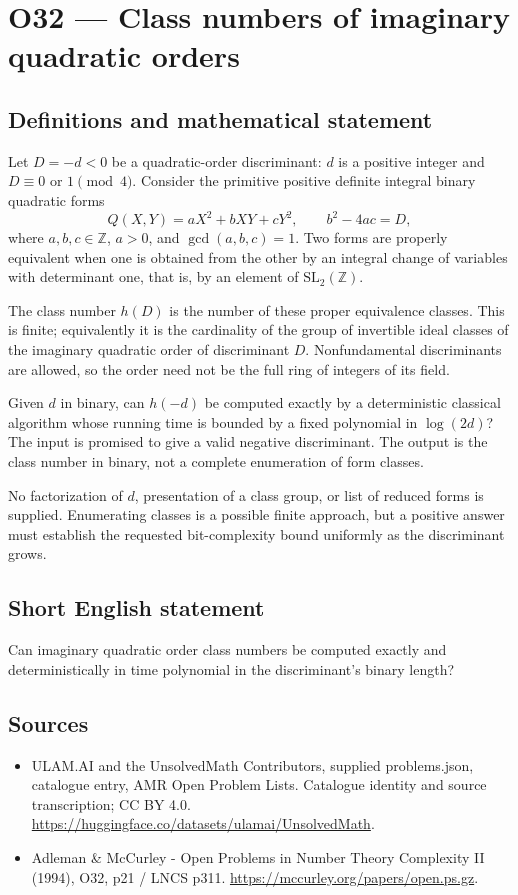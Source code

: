 \documentclass[11pt,a4paper]{article}
\begin{document}
\section*{O32 — Class numbers of imaginary quadratic orders}\label{statement}

\subsection{Definitions and mathematical statement}
Let $D=-d<0$ be a quadratic-order discriminant: $d$ is a positive integer and $D\equiv0$ or $1\pmod4$. Consider the primitive positive definite integral binary quadratic forms
\[
Q(X,Y)=aX^2+bXY+cY^2,\qquad b^2-4ac=D,
\]
where $a,b,c\in\mathbb Z$, $a>0$, and $\gcd(a,b,c)=1$. Two forms are properly equivalent when one is obtained from the other by an integral change of variables with determinant one, that is, by an element of $\mathrm{SL}_2(\mathbb Z)$.

The class number $h(D)$ is the number of these proper equivalence classes. This is finite; equivalently it is the cardinality of the group of invertible ideal classes of the imaginary quadratic order of discriminant $D$. Nonfundamental discriminants are allowed, so the order need not be the full ring of integers of its field.

Given $d$ in binary, can $h(-d)$ be computed exactly by a deterministic classical algorithm whose running time is bounded by a fixed polynomial in $\log(2d)$? The input is promised to give a valid negative discriminant. The output is the class number in binary, not a complete enumeration of form classes.

No factorization of $d$, presentation of a class group, or list of reduced forms is supplied. Enumerating classes is a possible finite approach, but a positive answer must establish the requested bit-complexity bound uniformly as the discriminant grows.
\subsection{Short English statement}
Can imaginary quadratic order class numbers be computed exactly and deterministically in time polynomial in the discriminant’s binary length?
\subsection{Sources}
\begin{itemize}
\item[S1] ULAM.AI and the UnsolvedMath Contributors, supplied problems.json, catalogue entry, AMR Open Problem Lists. Catalogue identity and source transcription; CC BY 4.0.
\url{https://huggingface.co/datasets/ulamai/UnsolvedMath}.
\item[S2] Adleman \& McCurley - Open Problems in Number Theory Complexity II (1994), O32, p21 / LNCS p311. 
\url{https://mccurley.org/papers/open.ps.gz}.
\end{itemize}
\end{document}

